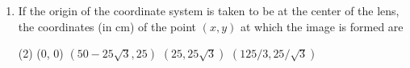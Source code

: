 
\begin{enumerate}
    \item If the origin of the coordinate system is taken to be at the center of the lens, the coordinates (in cm) of the point \((x,y)\) at which the image is formed are
        \begin{tasks}(2)
            \task (0, 0)
            \task \((50 - 25\sqrt{3}, 25)\)
            \task \((25, 25\sqrt{3})\)
            \task \((125/3, 25/\sqrt{3})\)
        \end{tasks}
\end{enumerate}
\begin{center}
\end{center}
